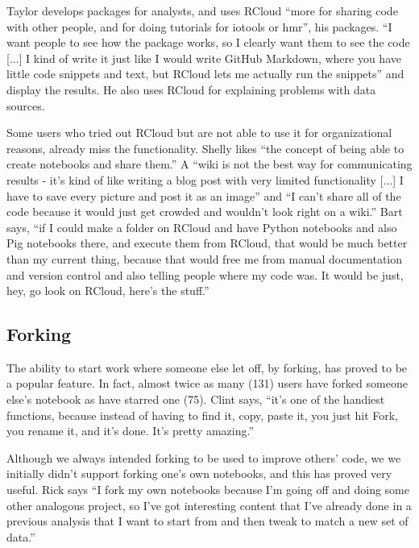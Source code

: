Taylor develops packages for analysts, and uses RCloud ``more for sharing code with
other people, and for doing tutorials for iotools or hmr'', his packages.
``I want people to see how the package works, so I clearly want them
to see the code [...] I kind of write it just like I would write GitHub
Markdown, where you have little code snippets and text, but RCloud lets me
actually run the snippets'' and display the results. He also uses RCloud for
explaining problems with data sources.

Some users who tried out RCloud but are not able to use it for organizational
reasons, already miss the functionality. Shelly likes ``the concept of being
able to create notebooks and share them.'' A ``wiki is not the best way for
communicating results - it's kind of like writing a blog post with very limited
functionality [...] I have to save every picture and post it as an image'' and
``I can't share all of the code because it would just get crowded and wouldn't
look right on a wiki.'' Bart says, ``if I could make a folder on RCloud and have
Python notebooks and also Pig notebooks there, and execute them from RCloud,
that would be much better than my current thing, because that would free me from
manual documentation and version control and also telling people where my code
was. It would be just, hey, go look on RCloud, here's the stuff.''



\subsection{Forking}
The ability to start work where someone else let off, by forking, has proved to
be a popular feature. In fact, almost twice as many (131) users have forked
someone else's notebook as have starred one (75).  Clint says, ``it's one of the
handiest functions, because instead of having to find it, copy, paste it, you
just hit Fork, you rename it, and it's done. It's pretty amazing.''

Although we always intended forking to be used to improve others' code, we we
initially didn't support forking one's own notebooks, and this has proved very
useful. Rick says ``I fork my own notebooks because I'm going off and doing some
other analogous project, so I've got interesting content that I've already done
in a previous analysis that I want to start from and then tweak to match a new
set of data.''

